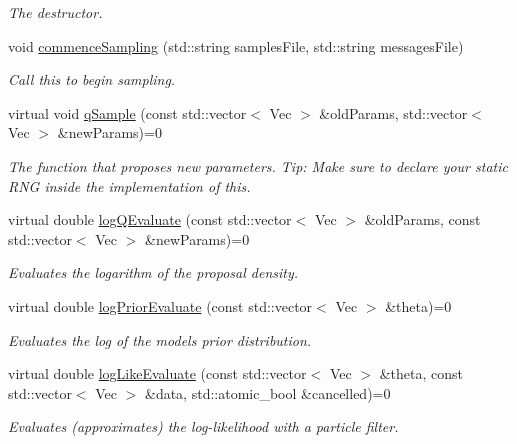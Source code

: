 \begin{DoxyCompactItemize}
\begin{DoxyCompactList}\small\item\em The destructor. \end{DoxyCompactList}\item 
void \hyperlink{classPmmh_ac035560cb209fb5cade23e431b5e1fd3}{commence\+Sampling} (std\+::string samples\+File, std\+::string messages\+File)
\begin{DoxyCompactList}\small\item\em Call this to begin sampling. \end{DoxyCompactList}\item 
virtual void \hyperlink{classPmmh_a7ada4decd5df894376c74e3ddba5daa1}{q\+Sample} (const std\+::vector$<$ Vec $>$ \&old\+Params, std\+::vector$<$ Vec $>$ \&new\+Params)=0
\begin{DoxyCompactList}\small\item\em The function that proposes new parameters. Tip\+: Make sure to declare your static R\+NG inside the implementation of this. \end{DoxyCompactList}\item 
virtual double \hyperlink{classPmmh_af8d3fdbc3f3c998670266a3032a53e80}{log\+Q\+Evaluate} (const std\+::vector$<$ Vec $>$ \&old\+Params, const std\+::vector$<$ Vec $>$ \&new\+Params)=0
\begin{DoxyCompactList}\small\item\em Evaluates the logarithm of the proposal density. \end{DoxyCompactList}\item 
virtual double \hyperlink{classPmmh_a265ca1c1380d0ebc052be2c5424a0d3b}{log\+Prior\+Evaluate} (const std\+::vector$<$ Vec $>$ \&theta)=0
\begin{DoxyCompactList}\small\item\em Evaluates the log of the model\textquotesingle{}s prior distribution. \end{DoxyCompactList}\item 
virtual double \hyperlink{classPmmh_a293931e138576f063aab7e46228f0266}{log\+Like\+Evaluate} (const std\+::vector$<$ Vec $>$ \&theta, const std\+::vector$<$ Vec $>$ \&data, std\+::atomic\+\_\+bool \&cancelled)=0
\begin{DoxyCompactList}\small\item\em Evaluates (approximates) the log-\/likelihood with a particle filter. \end{DoxyCompactList}\end{DoxyCompactItemize}


